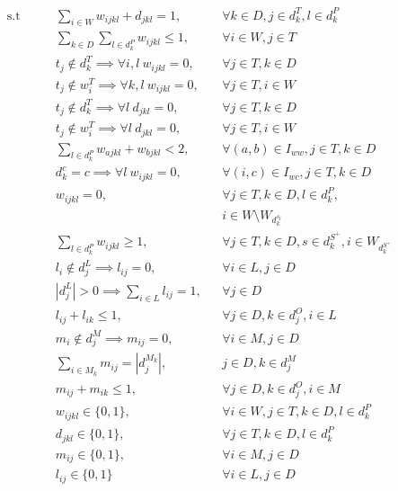 \documentclass[../../thesis.tex]{subfiles}
\begin{document}
\begin{align*}
    \textrm{s.t} \qquad & \sum_{i \in W} w_{ijkl} + d_{jkl} = 1, && \forall k \in D, j \in d_k^T, l \in d_k^P \\
    & \sum_{k \in D} \sum_{l \in d_k^P} w_{ijkl} \leq 1, && \forall i \in W, j \in T  \\
    & t_j \notin d^T_{k} \implies \forall i, l \ w_{ijkl} = 0,  && \forall j \in T , k \in D \\
    & t_j \notin w^T_{i} \implies \forall k, l \ w_{ijkl} = 0, && \forall j \in T, i \in W  \\ 
    & t_j \notin d^T_{k} \implies \forall l \ d_{jkl} = 0,  && \forall j \in T , k \in D  \\
    & t_j \notin w^T_{i} \implies \forall l \ d_{jkl} = 0, && \forall j \in T, i \in W  \\ 
    & \sum_{l \in d^P_k} w_{ajkl} + w_{bjkl} < 2, &&  \forall {(a, b) \in I_{ww}}, j \in T, k \in D \\
    & d^c_{k} = c \implies \forall l \ w_{ijkl} = 0, && \forall {(i, c) \in I_{wc}}, j \in T, k \in D  \\ 
    & w_{ijkl} = 0, && \forall j \in T, k \in D, l \in d^P_k,  \\
    & && i \in W \setminus W_{d^{s_l}_k} \\
    & \sum_{l \in d_k^P} w_{ijkl} \geq 1, && \forall j \in T, k \in D, s \in d^{S^+}_k, i \in W_{d^{S^+}_k}  \\
    & l_i \notin d^L_j \implies l_{ij} = 0, && \forall i \in L, j \in D   \\
    & |d^L_j| > 0 \implies \sum_{i \in L} l_{ij} = 1, && \forall j \in D \\
    & l_{ij} + l_{ik} \leq 1, && \forall j \in D, k \in d^O_j, i \in L \\
    & m_i \notin d^M_j \implies m_{ij} = 0, && \forall i \in M, j \in D   \\
    & \sum_{i \in M_k} m_{ij} = |d^{M_k}_j|, && j \in D, k \in d^M_j  \\
    & m_{ij} + m_{ik} \leq 1, && \forall j \in D, k \in d^O_j, i \in M  \\
    & w_{ijkl} \in \{0, 1\}, && \forall i \in W, j \in T, k \in D, l \in d^P_k  \\
    & d_{jkl} \in \{0, 1\}, && \forall j \in T, k \in D, l \in d^P_k  \\
    & m_{ij} \in \{0, 1\}, && \forall i \in M, j \in D  \\ 
    & l_{ij} \in \{0, 1\} && \forall i \in L, j \in D  
\end{align*}
\endgroup
\end{document}
